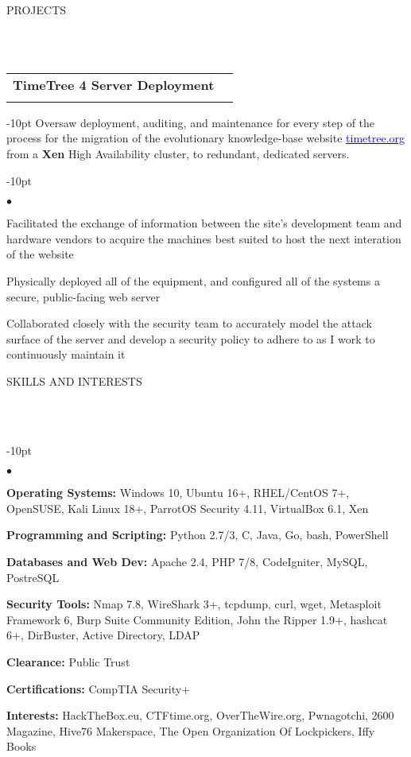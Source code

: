 \documentclass[12pt]{article}
\makeatletter
\newcommand{\header}[1]{
	\vspace*{12pt} %
	{\hspace*{-14pt}\vspace*{6pt} #1}
	\vspace*{-6pt} 
	\lineunder
}
\newcommand{\lineunder}{
	\vspace*{-8pt} \\ 
	\hspace*{-18pt} 
	\hrulefill \\
}
\newcommand{\subheading}[4]{
 	\vspace{5pt}
    	\begin{tabular*}{1.01\textwidth}
    		{l@{\extracolsep{\fill}}r}
      		\hspace{-16pt}\textbf{#1} & #2 \\
      		\hspace{-16pt}\textit{\small#3} & \textit{\small #4} \\
    	\end{tabular*}
    \vspace{-4pt}
}
\newenvironment{achievements}{
\begin{adjustwidth}{-10pt}{}
  \begin{list}{$\bullet$}{
  	\topsep 0pt \itemsep -4pt}}
  	{\vspace*{2pt}\end{list}
\end{adjustwidth}
}
\makeatother
\begin{document}
\vspace{-8pt}
\header{PROJECTS}

	
\subheading{TimeTree 4 Server Deployment}{}{}{}
	\vspace{-15pt}
	\begin{adjustwidth}{-10pt}{}
	Oversaw deployment, auditing, and maintenance for every step of the process for the migration of the evolutionary knowledge-base website \href{http://timetree.org}{\textcolor{blue}{timetree.org}} from a \textbf{Xen} High Availability cluster, to redundant, dedicated servers.
	\end{adjustwidth}
	\begin{achievements}		
		\item Facilitated the exchange of information between the site's development team and hardware vendors to acquire the machines best suited to host the next interation of the website
		\item Physically deployed all of the equipment, and configured all of the systems a secure, public-facing web server
		\item Collaborated closely with the security team to accurately model the attack surface of the server and develop a security policy to adhere to as I work to continuously maintain it
	\end{achievements}


\vspace{-8pt}
\header{SKILLS AND INTERESTS}
	\begin{achievements}
		\item{\bf Operating Systems:} Windows 10, Ubuntu 16+, RHEL/CentOS 7+, OpenSUSE, Kali Linux 18+, ParrotOS Security 4.11, VirtualBox 6.1, Xen
		\item{\bf Programming and Scripting:} Python 2.7/3, C, Java, Go, bash, PowerShell
		\item{\bf Databases and Web Dev:} Apache 2.4, PHP 7/8, CodeIgniter, MySQL, PostreSQL
		\item{\bf Security Tools:} Nmap 7.8, WireShark 3+, tcpdump, curl, wget, Metasploit Framework 6, Burp Suite Community Edition, John the Ripper 1.9+, hashcat 6+, DirBuster, Active Directory, LDAP
		\item{\bf Clearance:} Public Trust
		\item{\bf Certifications:} CompTIA Security+
		\item{\bf Interests:} HackTheBox.eu, CTFtime.org, OverTheWire.org, Pwnagotchi, 2600 Magazine, Hive76 Makerspace, The Open Organization Of Lockpickers, Iffy Books
	\end{achievements}
\end{document}
